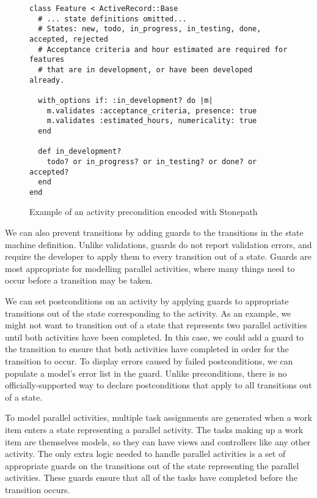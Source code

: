 \begin{figure}[!ht]
  \caption{Example of an activity precondition encoded with Stonepath}
  \label{fig:stonepath-precondition}
  \begin{lstlisting}
class Feature < ActiveRecord::Base
  # ... state definitions omitted...
  # States: new, todo, in_progress, in_testing, done, accepted, rejected
  # Acceptance criteria and hour estimated are required for features
  # that are in development, or have been developed already.

  with_options if: :in_development? do |m|
    m.validates :acceptance_criteria, presence: true
    m.validates :estimated_hours, numericality: true
  end

  def in_development?
    todo? or in_progress? or in_testing? or done? or accepted?
  end
end
  \end{lstlisting}
\end{figure}

We can also prevent transitions by adding guards to the transitions in the state machine definition. Unlike validations, guards do not report validation errors, and require the developer to apply them to every transition out of a state. Guards are most appropriate for modelling parallel activities, where many things need to occur before a transition may be taken.


We can set postconditions on an activity by applying guards to appropriate transitions out of the state corresponding to the activity. As an example, we might not want to transition out of a state that represents two parallel activities until both activities have been completed. In this case, we could add a guard to the transition to ensure that both activities have completed in order for the transition to occur. To display errors caused by failed postconditions, we can populate a model’s error list in the guard. Unlike preconditions, there is no officially-supported way to declare postconditions that apply to all transitions out of a state.


To model parallel activities, multiple task assignments are generated when a work item enters a state representing a parallel activity. The tasks making up a work item are themselves models, so they can have views and controllers like any other activity. The only extra logic needed to handle parallel activities is a set of appropriate guards on the transitions out of the state representing the parallel activities. These guards ensure that all of the tasks have completed before the transition occurs.

